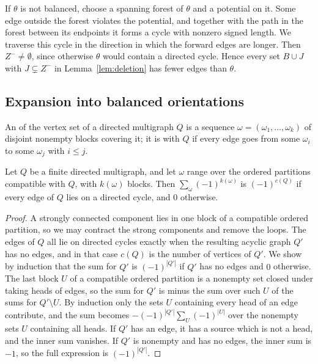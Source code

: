 If $\theta$ is not balanced, choose a spanning forest of $\theta$ and a potential
on it.
Some edge outside the forest violates the potential, and together with the path
in the forest between its endpoints it forms a cycle with nonzero signed length.
We traverse this cycle in the direction in which the forward edges are longer.
Then $Z^-\neq\emptyset$, since otherwise $\theta$ would contain a directed cycle.
Hence every set $B\cup J$ with $J\subsetneq Z^-$ in Lemma~\ref{lem:deletion} has fewer
edges than $\theta$.

\subsection{Expansion into balanced orientations}

An  of the vertex set of a directed multigraph $Q$ is
a sequence $\omega=(\omega_1,\dotsc,\omega_k)$ of disjoint nonempty blocks
covering it; it is  with $Q$ if every edge goes from some
$\omega_i$ to some $\omega_j$ with $i\leq j$.

\begin{lemma}\label{lem:orderedPartitions}
Let $Q$ be a finite directed multigraph, and let $\omega$ range over the ordered
partitions compatible with $Q$, with $k(\omega)$ blocks.
Then $\sum_{\omega}(-1)^{k(\omega)}$ is $(-1)^{c(Q)}$ if every edge of $Q$ lies on
a directed cycle, and $0$ otherwise.
\end{lemma}

\begin{proof}
A strongly connected component lies in one block of a compatible ordered
partition, so we may contract the strong components and remove the loops.
The edges of $Q$ all lie on directed cycles exactly when the resulting acyclic
graph $Q'$ has no edges, and in that case $c(Q)$ is the number of vertices of $Q'$.
We show by induction that the sum for $Q'$ is $(-1)^{|Q'|}$ if $Q'$ has no edges and
$0$ otherwise.
The last block $U$ of a compatible ordered partition is a nonempty set closed
under taking heads of edges, so the sum for $Q'$ is minus the sum over such $U$ of
the sums for $Q'\setminus U$.
By induction only the sets $U$ containing every head of an edge contribute, and
the sum becomes $-(-1)^{|Q'|}\sum_U(-1)^{|U|}$ over the nonempty sets $U$
containing all heads.
If $Q'$ has an edge, it has a source which is not a head, and the inner sum
vanishes.
If $Q'$ is nonempty and has no edges, the inner sum is $-1$, so the full
expression is $(-1)^{|Q'|}$.
\end{proof}

